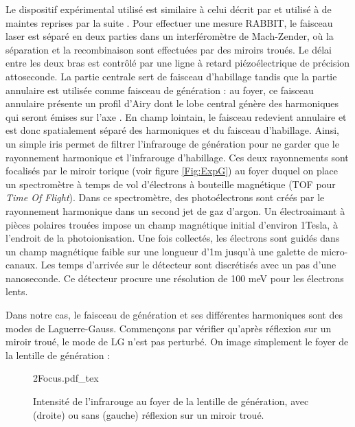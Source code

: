 Le dispositif expérimental utilisé est similaire à celui décrit par  et utilisé à de maintes reprises par la suite . Pour effectuer une mesure RABBIT, le faisceau laser est séparé en deux parties dans un interféromètre de Mach-Zender, où la séparation et la recombinaison sont effectuées par des miroirs troués. Le délai entre les deux bras est contrôlé par une ligne à retard piézoélectrique de précision attoseconde. La partie centrale sert de faisceau d'habillage tandis que la partie annulaire est utilisée comme faisceau de génération : au foyer, ce faisceau annulaire présente un profil d'Airy dont le lobe central génère des harmoniques qui seront émises sur l'axe . En champ lointain, le faisceau redevient annulaire et est donc spatialement séparé des harmoniques et du faisceau d'habillage. Ainsi, un simple iris permet de filtrer l'infrarouge de génération pour ne garder que le rayonnement harmonique et l'infrarouge d'habillage. Ces deux rayonnements sont focalisés par le miroir torique (voir figure \ref{Fig:ExpG}) au foyer duquel on place un spectromètre à temps de vol d'électrons à bouteille magnétique (TOF pour \textit{Time Of Flight}). Dans ce spectromètre, des photoélectrons sont créés par le rayonnement harmonique dans un second jet de gaz d'argon. Un électroaimant à pièces polaires trouées impose un champ magnétique initial d’environ 1Tesla, à l’endroit de la photoionisation. Une fois collectés, les électrons sont guidés dans un champ magnétique faible sur une longueur d’1m jusqu'à une galette de micro-canaux. Les temps d’arrivée sur le détecteur sont discrétisés avec un pas d’une nanoseconde. Ce détecteur procure une résolution de 100 meV pour les électrons lents. 

Dans notre cas, le faisceau de génération et ses différentes harmoniques sont des modes de Laguerre-Gauss. Commençons par vérifier qu'après réflexion sur un miroir troué, le mode de LG n'est pas perturbé. On image simplement le foyer de la lentille de génération :
%
\begin{figure}[!ht]
\centering
\def\svgwidth{.7\columnwidth}
{2Focus.pdf_tex}
\caption{Intensité de l'infrarouge au foyer de la lentille de génération, avec (droite) ou sans (gauche) réflexion sur un miroir troué.}
\label{Fig:2focus}
\end{figure}


